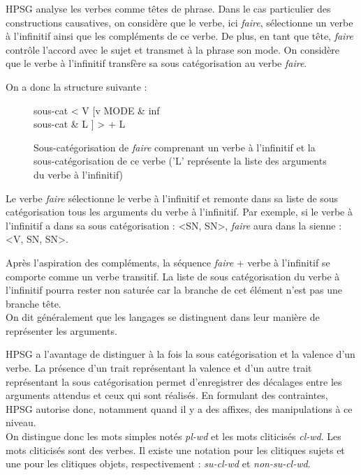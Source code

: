 HPSG  analyse les verbes comme têtes de phrase.
Dans le cas particulier des constructions causatives, on considère que le verbe, ici \emph{faire}, sélectionne un verbe à l'infinitif ainsi que les compléments de ce verbe.
De plus, en tant que tête, \emph{faire} contrôle l'accord avec le sujet et transmet à la phrase son mode.
On considère que le verbe à l'infinitif transfère sa sous catégorisation au verbe \emph{faire}.

On a donc la structure suivante :

\begin{figure}[ht]
\centering
\begin{avm}
			sous-cat  < V [{v}
                                       MODE & inf\\
                                       sous-cat & L
                                      ] > + L
\end{avm}
\caption{Sous-catégorisation de \emph{faire} comprenant un verbe à l'infinitif et la sous-catégorisation de ce verbe ('L' représente la liste des arguments du verbe à l'infinitif)}
\end{figure}


Le verbe \emph{faire} sélectionne le verbe à l'infinitif et remonte dans sa liste de sous catégorisation tous les arguments du verbe à l'infinitif.
Par exemple, si le verbe à l'infinitif a dans sa sous catégorisation : <SN, SN>, \emph{faire} aura dans la sienne : <V, SN, SN>.

Après l'aspiration des compléments, la séquence \emph{faire} + verbe à l'infinitif se comporte comme un verbe transitif.
La liste de sous catégorisation du verbe à l'infinitif pourra rester non saturée car la branche de cet élément n'est pas une branche tête.\\

On dit généralement que les langages se distinguent dans leur manière de représenter les arguments.

HPSG a l'avantage de distinguer à la fois la sous catégorisation et la valence d'un verbe.
La présence d'un trait représentant la valence et d'un autre trait représentant la sous catégorisation permet d'enregistrer des décalages entre les arguments attendus et ceux qui sont réalisés.
En formulant des contraintes, HPSG autorise donc, notamment quand il y a des affixes, des manipulations à ce niveau.\\

On distingue donc les mots simples notés \emph{pl-wd} et les mots cliticisés \emph{cl-wd}.
Les mots cliticisés sont des verbes.
Il existe une notation pour les clitiques sujets et une pour les clitiques objets, respectivement : \emph{su-cl-wd} et \emph{non-su-cl-wd}.\\

